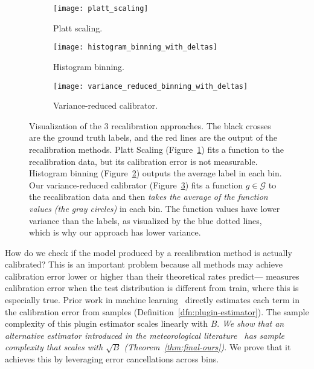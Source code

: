 \begin{figure}
     \centering
     \begin{subfigure}[b]{0.32\textwidth}
         \centering
         \texttt{[image: platt\_scaling]}
         \caption{Platt scaling.}
         \label{fig:platt_scaling}
     \end{subfigure}
     \hfill
     \begin{subfigure}[b]{0.32\textwidth}
         \centering
         \texttt{[image: histogram\_binning\_with\_deltas]}
         \caption{Histogram binning.}
         \label{fig:hist_binning}
     \end{subfigure}
     \hfill
     \begin{subfigure}[b]{0.32\textwidth}
         \centering
         \texttt{[image: variance\_reduced\_binning\_with\_deltas]}
         \caption{Variance-reduced calibrator.}
         \label{fig:var_red_binning}
     \end{subfigure}
        \caption{
        Visualization of the 3 recalibration approaches.
        The black crosses are the ground truth labels, and the red lines are the output of the recalibration methods.
        Platt Scaling (Figure~\ref{fig:platt_scaling}) fits a function to the recalibration data, but its calibration error is not measurable.
        Histogram binning (Figure~\ref{fig:hist_binning}) outputs the average label in each bin.
        Our variance-reduced calibrator (Figure~\ref{fig:var_red_binning}) fits a function $g \in \mathcal{G}$ to the recalibration data and then \emph{takes the average of the function values (the gray circles)} in each bin.
        The function values have lower variance than the labels, as visualized by the blue dotted lines, which is why our approach has lower variance. 
        }
        \label{fig:variance_reduced_illustration}
\end{figure}

How do we check if the model produced by a recalibration method is actually calibrated? This is an important problem because all methods may achieve calibration error lower or higher than their theoretical rates predict---\cite{hendrycks2019anomaly} measures calibration error when the test distribution is different from train, where this is especially true. Prior work in machine learning~\cite{nguyen2015posterior, guo2017calibration, hendrycks2019anomaly, kuleshov2015calibrated, hendrycks2019pretraining} directly estimates each term in the calibration error from samples (Definition~\ref{dfn:plugin-estimator}).
The sample complexity of this plugin estimator scales linearly with $B$.
\emph{We show that an alternative estimator introduced in the meteorological literature~\cite{brocker2012empirical, ferro2012bias} has sample complexity that scales with $\sqrt{B}$ (Theorem~\ref{thm:final-ours})}.
We prove that it achieves this by leveraging error cancellations across bins.

